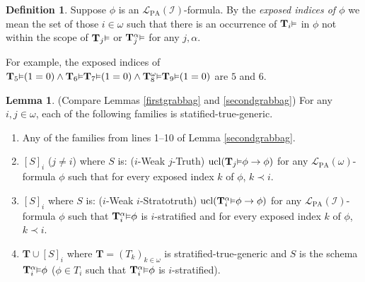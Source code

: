 \documentclass[reqno]{article}
\theoremstyle{definition}
\newtheorem{lemma}[theorem]{Lemma}
\newtheorem{definition}[theorem]{Definition}
\def\L{\mathscr{L}}
\def\T{\mathbf{T}}
\def\LPA{\L_{\mathrm{PA}}}
\def\indset{\mathcal I}
\renewcommand{\Pr}[1]{\T_{#1}\mbox{\small${\vDash}$}}
\newcommand{\Prr}[2]{\T^{#1}_{#2}\mbox{\small${\vDash}$}}
\newcommand{\ucl}[1]{\mathrm{ucl}(#1)}
\begin{document}
\begin{definition}
Suppose $\phi$ is an $\LPA(\indset)$-formula.
By the \emph{exposed indices of $\phi$} we mean the set of those $i\in\omega$ such
that there is an occurrence of $\Pr i$ in $\phi$ not within the scope of
$\Pr j$ or $\Prr\alpha j$ for any $j,\alpha$.
\end{definition}

For example, the exposed indices of
$\Pr 5(1=0) \wedge \Pr 6\Pr 7(1=0)\wedge \Prr\omega 8\Pr 9(1=0)$
are $5$ and $6$.

\begin{lemma}
\label{thirdgrabbag}
(Compare Lemmas \ref{firstgrabbag} and \ref{secondgrabbag})
For any $i,j\in\omega$, each of the following families is statified-true-generic.
\begin{enumerate}
\item Any of the families from lines 1--10 of Lemma \ref{secondgrabbag}.
\item $[S]_i$ ($j\not=i$) where $S$ is: ($i$-Weak $j$-Truth) $\ucl{\Pr j\phi\rightarrow\phi}$ for any $\LPA(\omega)$-formula $\phi$
such that for every exposed index $k$ of $\phi$, $k\prec i$.
\item $[S]_i$ where $S$ is: ($i$-Weak $i$-Stratotruth) $\ucl{\Prr\alpha i\phi\rightarrow\phi}$ for any $\LPA(\indset)$-formula $\phi$ such that 
$\Prr\alpha i\phi$ is $i$-stratified and for every exposed index $k$ of $\phi$, $k\prec i$.
%
%
%
\item $\T\cup [S]_i$ where $\T=(T_k)_{k\in\omega}$ is stratified-true-generic and $S$ is the schema $\Prr\alpha i\phi$ ($\phi\in T_i$ such that 
$\Prr\alpha i \phi$ is $i$-stratified).
\end{enumerate}
\end{lemma}
\end{document}
